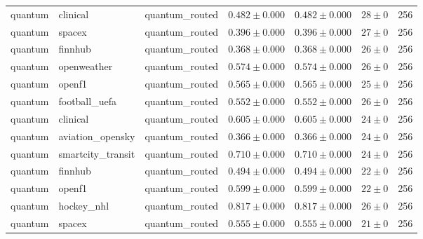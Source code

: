 \begin{table}[htbp]
\begin{tabular}{l l l r r r r}
quantum & clinical & quantum\_routed & $0.482\pm0.000$ & $0.482\pm0.000$ & $28\pm0$ & 256 \\
quantum & spacex & quantum\_routed & $0.396\pm0.000$ & $0.396\pm0.000$ & $27\pm0$ & 256 \\
quantum & finnhub & quantum\_routed & $0.368\pm0.000$ & $0.368\pm0.000$ & $26\pm0$ & 256 \\
quantum & openweather & quantum\_routed & $0.574\pm0.000$ & $0.574\pm0.000$ & $26\pm0$ & 256 \\
quantum & openf1 & quantum\_routed & $0.565\pm0.000$ & $0.565\pm0.000$ & $25\pm0$ & 256 \\
quantum & football\_uefa & quantum\_routed & $0.552\pm0.000$ & $0.552\pm0.000$ & $26\pm0$ & 256 \\
quantum & clinical & quantum\_routed & $0.605\pm0.000$ & $0.605\pm0.000$ & $24\pm0$ & 256 \\
quantum & aviation\_opensky & quantum\_routed & $0.366\pm0.000$ & $0.366\pm0.000$ & $24\pm0$ & 256 \\
quantum & smartcity\_transit & quantum\_routed & $0.710\pm0.000$ & $0.710\pm0.000$ & $24\pm0$ & 256 \\
quantum & finnhub & quantum\_routed & $0.494\pm0.000$ & $0.494\pm0.000$ & $22\pm0$ & 256 \\
quantum & openf1 & quantum\_routed & $0.599\pm0.000$ & $0.599\pm0.000$ & $22\pm0$ & 256 \\
quantum & hockey\_nhl & quantum\_routed & $0.817\pm0.000$ & $0.817\pm0.000$ & $26\pm0$ & 256 \\
quantum & spacex & quantum\_routed & $0.555\pm0.000$ & $0.555\pm0.000$ & $21\pm0$ & 256 \\
\hline
\end{tabular}
\end{table}
